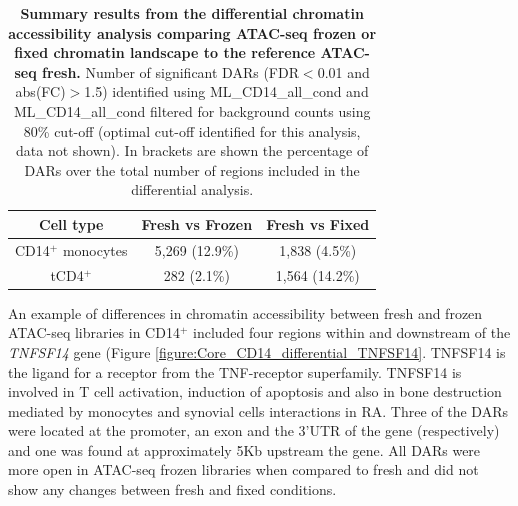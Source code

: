 	
\begin{table}[htbp]
\centering
\begin{tabular}{@{} c c c}
\toprule
\textbf{Cell type} & \textbf{Fresh vs Frozen} & \textbf{Fresh vs Fixed} \\
\midrule
\midrule
CD14$^+$ monocytes & 5,269 (12.9\%) & 1,838 (4.5\%) \\
tCD4$^+$           & 282  (2.1\%)   & 1,564 (14.2\%) \\
\bottomrule
\end{tabular}
\medskip %
\caption[Summary results from the differential chromatin accessibility analysis comparing ATAC-seq frozen or fixed chromatin landscape to the reference ATAC-seq fresh.]{\textbf{Summary results from the differential chromatin accessibility analysis comparing ATAC-seq frozen or fixed chromatin landscape to the reference ATAC-seq fresh.} Number of significant DARs (FDR$<$0.01 and abs(FC)$>$1.5) identified using ML\_CD14\_all\_cond and ML\_CD14\_all\_cond filtered for background counts using 80\% cut-off (optimal cut-off identified for this analysis, data not shown). In brackets are shown the percentage of DARs over the total number of regions included in the differential analysis.}
\label{tab:Core_ATAC_all_conditions_DARs}
\end{table}
\bigskip %
	
An example of differences in chromatin accessibility between fresh and frozen ATAC-seq libraries in CD14$^+$ included four regions within and downstream of the \textit{TNFSF14} gene (Figure \ref{figure:Core_CD14_differential_TNFSF14}. TNFSF14 is the ligand for a receptor from the TNF-receptor superfamily. TNFSF14 is involved in T cell activation, induction of apoptosis and  also in bone destruction mediated by monocytes and synovial cells interactions in RA. Three of the DARs were located at the promoter, an exon and the 3'UTR of the gene (respectively) and one was found at approximately 5Kb upstream the gene. All DARs were more open in ATAC-seq frozen libraries when compared to fresh and did not show any changes between fresh and fixed conditions.%

	
	
